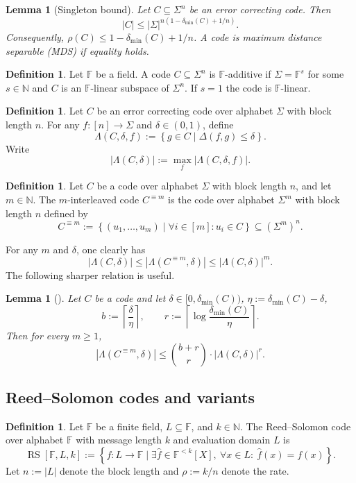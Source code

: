 \documentclass[11pt]{article}
\theoremstyle{plain}
\newtheorem{lemma}[theorem]{Lemma}
\theoremstyle{definition}
\newtheorem{definition}[theorem]{Definition}
\newcommand{\F}{\mathbb{F}}
\newcommand{\N}{\mathbb{N}}
\newcommand{\RS}[3]{\operatorname{RS}[#1,#2,#3]}
\newcommand{\distmin}{\delta_{\min}}
\newcommand{\set}[1]{\left\{#1\right\}}
\newcommand{\ceil}[1]{\left\lceil #1\right\rceil}
\newcommand{\abs}[1]{\left|#1\right|}
\begin{document}
\begin{lemma}[Singleton bound]
Let $C\subseteq\Sigma^n$ be an error correcting code. Then
\[
  \abs{C}\le \abs{\Sigma}^{n(1-\distmin(C)+1/n)}.
\]
Consequently, $\rho(C)\le 1-\distmin(C)+1/n$. A code is maximum distance separable (MDS) if equality holds.
\end{lemma}

\begin{definition}
Let $\F$ be a field. A code $C\subseteq\Sigma^n$ is $\F$-additive if $\Sigma=\F^s$ for some $s\in\N$ and $C$ is an $\F$-linear subspace of $\Sigma^n$. If $s=1$ the code is $\F$-linear.
\end{definition}

\begin{definition}
Let $C$ be an error correcting code over alphabet $\Sigma$ with block length $n$. For any $f:[n]\to\Sigma$ and $\delta\in(0,1)$, define
\[
  \Lambda(C,\delta,f):=\set{g\in C\mid \Delta(f,g)\le\delta}.
\]
Write
\[
  \abs{\Lambda(C,\delta)}:=\max_f \abs{\Lambda(C,\delta,f)}.
\]
\end{definition}

\begin{definition}
Let $C$ be a code over alphabet $\Sigma$ with block length $n$, and let $m\in\N$. The $m$-interleaved code $C^{\equiv m}$ is the code over alphabet $\Sigma^m$ with block length $n$ defined by
\[
  C^{\equiv m}:=\set{(u_1,
\ldots,u_m)\mid \forall i\in[m]: u_i\in C}\subseteq(\Sigma^m)^n.
\]
\end{definition}

For any $m$ and $\delta$, one clearly has
\[
  \abs{\Lambda(C,\delta)}\le \abs{\Lambda(C^{\equiv m},\delta)}\le \abs{\Lambda(C,\delta)}^m.
\]
The following sharper relation is useful.

\begin{lemma}[\cite{GGR11}]
Let $C$ be a code and let $\delta\in[0,\distmin(C))$, $\eta:=\distmin(C)-\delta$,
\[
  b:=\ceil{\frac{\delta}{\eta}},\qquad r:=\ceil{\log\frac{\distmin(C)}{\eta}}.
\]
Then for every $m\ge1$,
\[
  \abs{\Lambda(C^{\equiv m},\delta)}\le \binom{b+r}{r}\cdot \abs{\Lambda(C,\delta)}^r.
\]
\end{lemma}

\subsection{Reed--Solomon codes and variants}

\begin{definition}
Let $\F$ be a finite field, $L\subseteq\F$, and $k\in\N$. The Reed--Solomon code over alphabet $\F$ with message length $k$ and evaluation domain $L$ is
\[
  \RS{\F}{L}{k}:=\set{f:L\to\F\mid \exists \hat f\in\F^{<k}[X],\ \forall x\in L:\ \hat f(x)=f(x)}.
\]
Let $n:=\abs{L}$ denote the block length and $\rho:=k/n$ denote the rate.
\end{definition}
\end{document}
